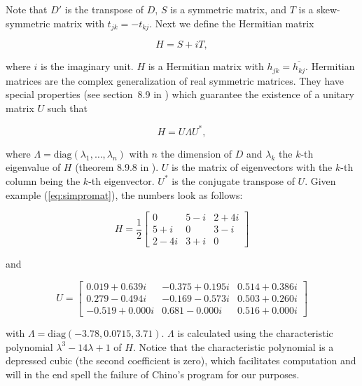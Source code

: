 \documentclass[phd,12pt,oneside]{ubcthesis}
\begin{document}
{\noindent}Note that $D'$ is the transpose of $D$, $S$ is a symmetric matrix, and
$T$ is a skew-symmetric matrix with $t_{jk}=-t_{kj}$. Next we define
the Hermitian matrix

\begin{equation}
  \label{eq:herm}
  H=S+iT,
\end{equation}

{\noindent}where $i$ is the imaginary unit. $H$ is a Hermitian matrix with
$h_{jk}=\overline{h_{kj}}$. Hermitian matrices are the complex
generalization of real symmetric matrices. They have special
properties (see section~8.9 in ) which
guarantee the existence of a unitary matrix $U$ such that

\begin{equation}
  \label{eq:unitary}
  H=U\Lambda{}U^{*},
\end{equation}

{\noindent}where $\Lambda=\mbox{diag}(\lambda_{1},\ldots,\lambda_{n})$ with $n$
the dimension of $D$ and $\lambda_{k}$ the $k$-th eigenvalue of $H$
(theorem 8.9.8 in ). $U$ is the matrix of
eigenvectors with the $k$-th column being the $k$-th eigenvector.
$U^{*}$ is the conjugate transpose of $U$. Given example
(\ref{eq:simpromat}), the numbers look as follows:

\begin{equation}
  \label{eq:simh}
H=\frac{1}{2}\left[
      \begin{array}{ccc}
        0 & 5-i & 2+4i \\
        5+i & 0 & 3-i \\
        2-4i & 3+i & 0 
      \end{array}
\right]
\end{equation}

{\noindent}and

\begin{equation}
  \label{eq:simu}
U=\left[
      \begin{array}{ccc}
   0.019 + 0.639i & -0.375 + 0.195i &  0.514 + 0.386i \\
   0.279 - 0.494i & -0.169 - 0.573i &  0.503 + 0.260i \\
  -0.519 + 0.000i &  0.681 - 0.000i &  0.516 + 0.000i
      \end{array}
\right]
\end{equation}

{\noindent}with $\Lambda=\mbox{diag}(-3.78,0.0715,3.71)$. $\Lambda$ is
calculated using the characteristic polynomial
$\lambda^{3}-14\lambda+1$ of $H$. Notice that the characteristic
polynomial is a depressed cubic (the second coefficient is zero),
which facilitates computation and will in the end spell the failure of
Chino's program for our purposes.
\end{document}
